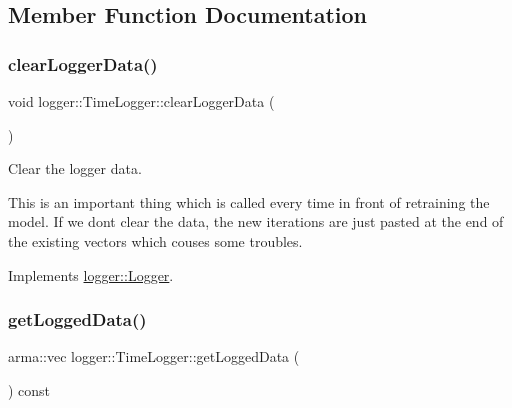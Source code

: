 \subsection{Member Function Documentation}
\mbox{\label{classlogger_1_1_time_logger_aab07eb43e5e9ac80634a67baacd642b4}} 
\subsubsection{\texorpdfstring{clear\+Logger\+Data()}{clearLoggerData()}}
{\footnotesize\ttfamily void logger\+::\+Time\+Logger\+::clear\+Logger\+Data (\begin{DoxyParamCaption}{ }\end{DoxyParamCaption})\hspace{0.3cm}{\ttfamily [virtual]}}



Clear the logger data. 

This is an important thing which is called every time in front of retraining the model. If we don\textquotesingle{}t clear the data, the new iterations are just pasted at the end of the existing vectors which couses some troubles. 

Implements \mbox{\hyperlink{classlogger_1_1_logger_a8c68db2430fa84b67528bfa6ae45a516}{logger\+::\+Logger}}.

\mbox{\label{classlogger_1_1_time_logger_a1603279c79e69795133f1be9f3238d64}} 
\subsubsection{\texorpdfstring{get\+Logged\+Data()}{getLoggedData()}}
{\footnotesize\ttfamily arma\+::vec logger\+::\+Time\+Logger\+::get\+Logged\+Data (\begin{DoxyParamCaption}{ }\end{DoxyParamCaption}) const\hspace{0.3cm}{\ttfamily [virtual]}}



